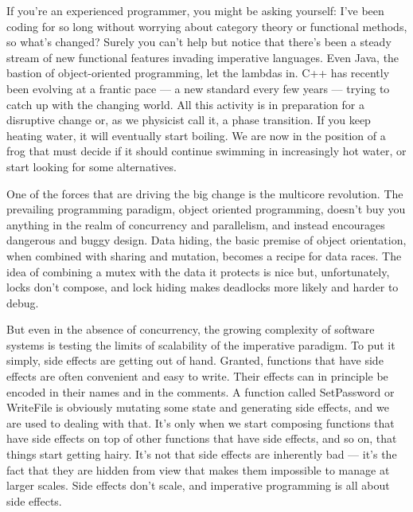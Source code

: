 If you're an experienced programmer, you might be asking yourself: I've
been coding for so long without worrying about category theory or
functional methods, so what's changed? Surely you can't help but notice
that there's been a steady stream of new functional features invading
imperative languages. Even Java, the bastion of object-oriented
programming, let the lambdas in. C++ has recently been evolving at a
frantic pace --- a new standard every few years --- trying to catch up
with the changing world. All this activity is in preparation for a
disruptive change or, as we physicist call it, a phase transition. If
you keep heating water, it will eventually start boiling. We are now in
the position of a frog that must decide if it should continue swimming
in increasingly hot water, or start looking for some alternatives.

\begin{figure}
\centering
{}
\end{figure}

One of the forces that are driving the big change is the multicore
revolution. The prevailing programming paradigm, object oriented
programming, doesn't buy you anything in the realm of concurrency and
parallelism, and instead encourages dangerous and buggy design. Data
hiding, the basic premise of object orientation, when combined with
sharing and mutation, becomes a recipe for data races. The idea of
combining a mutex with the data it protects is nice but, unfortunately,
locks don't compose, and lock hiding makes deadlocks more likely and
harder to debug.

But even in the absence of concurrency, the growing complexity of
software systems is testing the limits of scalability of the imperative
paradigm. To put it simply, side effects are getting out of hand.
Granted, functions that have side effects are often convenient and easy
to write. Their effects can in principle be encoded in their names and
in the comments. A function called SetPassword or WriteFile is obviously
mutating some state and generating side effects, and we are used to
dealing with that. It's only when we start composing functions that have
side effects on top of other functions that have side effects, and so
on, that things start getting hairy. It's not that side effects are
inherently bad --- it's the fact that they are hidden from view that
makes them impossible to manage at larger scales. Side effects don't
scale, and imperative programming is all about side effects.

